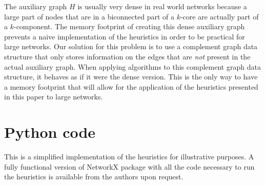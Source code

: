 The auxiliary graph $H$ is usually very dense in real world networks because a large part of nodes that are in a biconnected part of a $k$-core are actually part of a $k$-component. The memory footprint of creating this dense auxiliary graph prevents a naive implementation of the heuristics in order to be practical for large networks. Our solution for this problem is to use a complement graph data structure that only stores information on the edges that are \emph{not} present in the actual auxiliary graph. When applying algorithms to this complement graph data structure, it behaves as if it were the dense version. This is the only way to have a memory footprint that will allow for the application of the heuristics presented in this paper to large networks.

\newpage

\section{Python code}
\label{code}

This is a simplified implementation of the heuristics for illustrative purposes. A fully functional version of NetworkX package with all the code necessary to run the heuristics is available from the authors upon request. 


